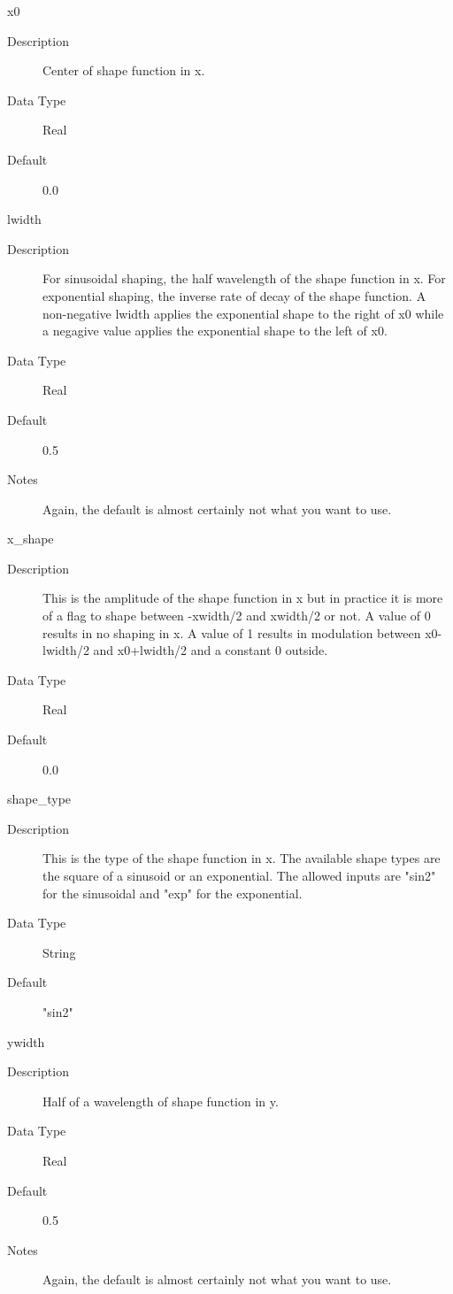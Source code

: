 \documentclass[11pt]{amsart}
\begin{document}
x0
\begin{description}
\item [Description] Center of shape function in x.
\item [Data Type] Real
\item [Default] 0.0
\end{description}

lwidth
\begin{description}
\item [Description] For sinusoidal shaping, the half wavelength of the shape
function in x.  For exponential shaping, the inverse rate of decay of the shape
function.  A non-negative lwidth applies the exponential shape to the right of
x0 while a negagive value applies the exponential shape to the left of x0.
\item [Data Type] Real
\item [Default] 0.5
\item [Notes] Again, the default is almost certainly not what you want to use.
\end{description}

x\_shape
\begin{description}
\item [Description] This is the amplitude of the shape function in x but in
practice it is more of a flag to shape between -xwidth/2 and xwidth/2 or
not.  A value of 0 results in no shaping in x.  A value of 1 results in
modulation between x0-lwidth/2 and x0+lwidth/2 and a constant 0 outside.
\item [Data Type] Real
\item [Default] 0.0
\end{description}

shape\_type
\begin{description}
\item [Description] This is the type of the shape function in x.  The available
shape types are the square of a sinusoid or an exponential.  The allowed inputs
are "sin2" for the sinusoidal and "exp" for the exponential.
\item [Data Type] String
\item [Default] "sin2"
\end{description}

ywidth
\begin{description}
\item [Description] Half of a wavelength of shape function in y.
\item [Data Type] Real
\item [Default] 0.5
\item [Notes] Again, the default is almost certainly not what you want to use.
\end{description}
\end{document}
